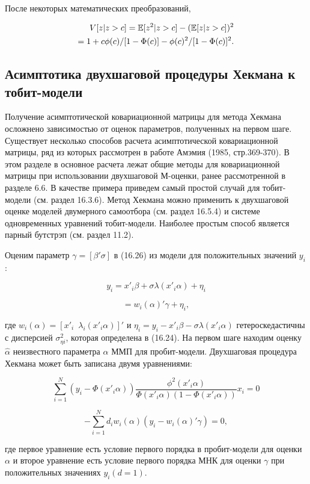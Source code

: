 После некоторых математических преобразований, 


\begin{align}
V[z|z>c]=\mathbb{E}[z^2|z>c]-(\mathbb{E}[z|z>c])^2 \\
=1+c\phi(c)/[1-\Phi(c)]-\phi(c)^2/[1-\Phi(c)]^{2}.
\end{align}



\subsection{Асимптотика двухшаговой процедуры Хекмана к тобит-модели}

Получение  асимптотической ковариационной матрицы для метода Хекмана осложнено зависимостью  от оценок параметров, полученных на первом шаге. Существует несколько способов расчета асимптотической ковариационной матрицы, ряд из которых рассмотрен в работе Амэмия (1985, стр.369-370). В этом разделе в основное расчета лежат общие методы для ковариационной матрицы при использовании двухшаговой М-оценки, ранее рассмотренной в разделе 6.6. В качестве примера приведем самый простой случай для тобит-модели (см. раздел 16.3.6). Метод Хекмана можно применить к двухшаговой оценке моделей двумерного самоотбора (см. раздел 16.5.4) и системе одновременных уравнений тобит-модели. Наиболее простым способ является парный бутстрэп (см. раздел 11.2).

Оценим параметр $\gamma=[\beta'\sigma]$ в (16.26) из модели для положительных значений $y_i$:

\[
y_i=x'_{i}\beta+\sigma\lambda(x'_{i}\alpha)+\eta_i
\]

\[
=w_i(\alpha)'\gamma+\eta_i,
\]

где $w_{i}(\alpha)={[{x'}_i \,\,\, \lambda_i({x'}_i\alpha)]}'$ и $\eta_i=y_i-{x'}_i\beta-\sigma\lambda({x'}_i\alpha)$ гетероскедастичны с дисперсией $\sigma^2_{\eta i}$, которая определена в (16.24). На первом шаге находим оценку $\hat{\alpha}$ неизвестного параметра $\alpha$ ММП для пробит-модели. Двухшаговая процедура Хекмана может быть записана двумя уравнениями:

\begin{equation}
\sum_{i=1}^N(y_i-\Phi({x'}_i\alpha))
\frac{\phi^2({x'}_i\alpha)}{\Phi({x'}_i\alpha)(1-\Phi({x'}_i\alpha))}x_{i}=0
\end{equation}


\[
-\sum_{i=1}^N d_iw_i(\alpha)(y_i-w_i(\alpha)'\gamma) =0,
\]

где первое уравнение есть условие первого порядка в пробит-модели для оценки $\alpha$ и второе уравнение есть условие первого порядка МНК для оценки  $\gamma$ при положительных значениях $y_{i}(d=1)$.

